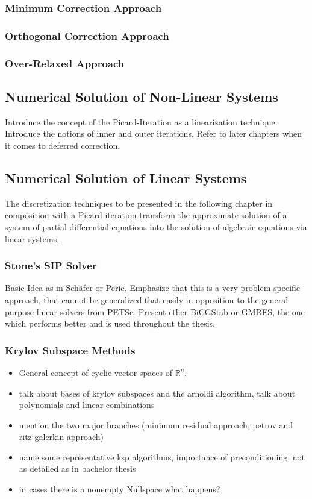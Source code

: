       \subsubsection{Minimum Correction Approach}
      \subsubsection{Orthogonal Correction Approach}
      \subsubsection{Over-Relaxed Approach}

    \subsection{Numerical Solution of Non-Linear Systems}

      Introduce the concept of the Picard-Iteration as a linearization technique. Introduce the notions of inner and outer iterations. Refer to later chapters when it comes to deferred correction.

    \subsection{Numerical Solution of Linear Systems}

        The discretization techniques to be presented in the following chapter in composition with a Picard iteration transform the approximate solution of a system of partial differential equations into the solution of algebraic equations via linear systems.

       \subsubsection{Stone's SIP Solver}

         Basic Idea as in Schäfer or Peric. Emphasize that this is a very problem specific approach, that cannot be generalized that easily in opposition to the general purpose linear solvers from PETSc. Present ether BiCGStab or GMRES, the one which performs better and is used throughout the thesis.

       \subsubsection{Krylov Subspace Methods}
        \begin{itemize}
          \item General concept of cyclic vector spaces of \(\mathbb{R}^n\), 
          \item talk about bases of krylov subspaces and the arnoldi algorithm, talk about polynomials and linear combinations
          \item mention the two major branches (minimum residual approach, petrov and ritz-galerkin approach) 
          \item name some representative ksp algorithms, importance of preconditioning, not as detailed as in bachelor thesis
          \item in cases there is a nonempty Nullspace what happens?
        \end{itemize}


